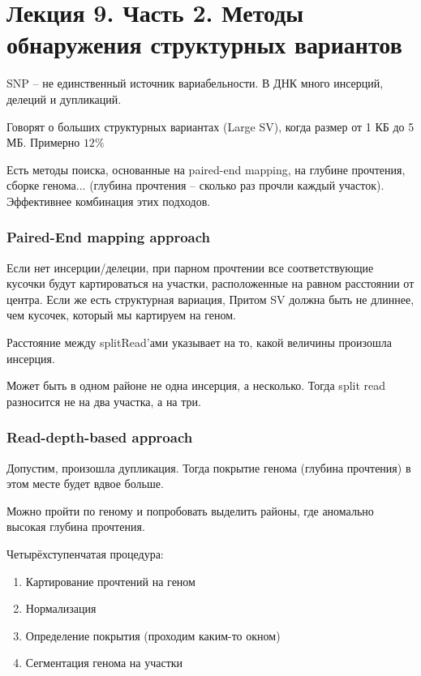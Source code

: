 \documentclass[main.tex]{subfiles}
\begin{document}
\section{Лекция 9. Часть 2. Методы обнаружения структурных вариантов}

SNP -- не единственный источник вариабельности.
В ДНК много инсерций, делеций и дупликаций.

Говорят о больших структурных вариантах (Large SV), когда размер от 1 КБ до 5 МБ.
Примерно $ 12 \% $

Есть методы поиска, основанные на paired-end mapping, на глубине прочтения, сборке генома...
(глубина прочтения -- сколько раз прочли каждый участок).
Эффективнее комбинация этих подходов.

\subsubsection{ Paired-End mapping approach }

Если нет инсерции/делеции, при парном прочтении все соответствующие кусочки будут картироваться на  участки, расположенные на равном расстоянии от центра.
Если же есть структурная вариация,
Притом SV должна быть не длиннее, чем кусочек, который мы картируем на геном.


Расстояние между splitRead'ами указывает на то, какой величины произошла инсерция.

Может быть в одном районе не одна инсерция, а несколько.
Тогда split read разносится не на два участка, а на три.

\subsubsection{Read-depth-based approach}

Допустим, произошла дупликация.
Тогда покрытие генома (глубина прочтения) в этом месте будет вдвое больше.

Можно пройти по геному и попробовать выделить районы, где аномально высокая глубина прочтения.

Четырёхступенчатая процедура:

\begin{enumerate}[noitemsep]
    \item Картирование прочтений на геном
    \item Нормализация
    \item Определение покрытия (проходим каким-то окном)
    \item Сегментация генома на участки
\end{enumerate}
\end{document}
